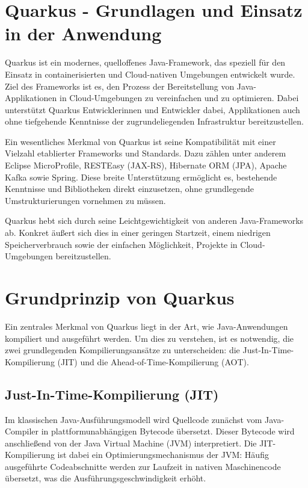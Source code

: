 \section{Quarkus - Grundlagen und Einsatz in der Anwendung}

Quarkus ist ein modernes, quelloffenes Java-Framework, das speziell für den Einsatz 
in containerisierten und Cloud-nativen Umgebungen entwickelt wurde. Ziel des Frameworks 
ist es, den Prozess der Bereitstellung von Java-Applikationen in Cloud-Umgebungen zu 
vereinfachen und zu optimieren. Dabei unterstützt Quarkus Entwicklerinnen und Entwickler 
dabei, Applikationen auch ohne tiefgehende Kenntnisse der zugrundeliegenden Infrastruktur 
bereitzustellen.

Ein wesentliches Merkmal von Quarkus ist seine Kompatibilität mit einer Vielzahl 
etablierter Frameworks und Standards. Dazu zählen unter anderem Eclipse MicroProfile, 
RESTEasy (JAX-RS), Hibernate ORM (JPA), Apache Kafka sowie Spring. Diese breite 
Unterstützung ermöglicht es, bestehende Kenntnisse und Bibliotheken direkt einzusetzen, 
ohne grundlegende Umstrukturierungen vornehmen zu müssen.

Quarkus hebt sich durch seine Leichtgewichtigkeit von anderen Java-Frameworks ab. 
Konkret äußert sich dies in einer geringen Startzeit, einem niedrigen Speicherverbrauch 
sowie der einfachen Möglichkeit, Projekte in Cloud-Umgebungen bereitzustellen.


\section{Grundprinzip von Quarkus}

Ein zentrales Merkmal von Quarkus liegt in der Art, wie Java-Anwendungen kompiliert 
und ausgeführt werden. Um dies zu verstehen, ist es notwendig, die zwei grundlegenden 
Kompilierungsansätze zu unterscheiden: die Just-In-Time-Kompilierung (JIT) und die 
Ahead-of-Time-Kompilierung (AOT).

\subsection{Just-In-Time-Kompilierung (JIT)}

Im klassischen Java-Ausführungsmodell wird Quellcode zunächst vom Java-Compiler in 
plattformunabhängigen Bytecode übersetzt. Dieser Bytecode wird anschließend von der 
Java Virtual Machine (JVM) interpretiert. Die JIT-Kompilierung ist dabei ein 
Optimierungsmechanismus der JVM: Häufig ausgeführte Codeabschnitte werden zur Laufzeit 
in nativen Maschinencode übersetzt, was die Ausführungsgeschwindigkeit erhöht.

